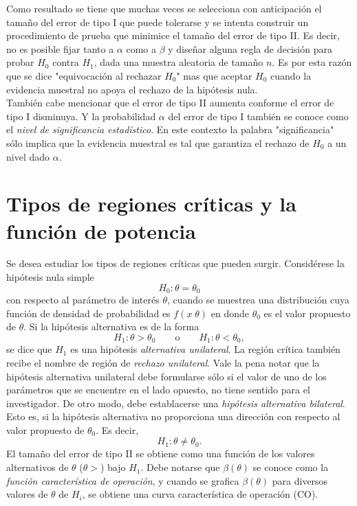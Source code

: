 Como resultado se tiene que muchas veces se selecciona con anticipación el tamaño del error de tipo I que puede tolerarse y se intenta construir un procedimiento de prueba que minimice el tamaño del error de tipo II. Es decir, no es posible fijar tanto a $\alpha$ como a $\beta$ y diseñar alguna regla de decisión para probar $H_0$ contra $H_1$, dada una muestra aleatoria de tamaño $n$. Es por esta razón que se dice "equivocación al rechazar $H_0$" mas que aceptar $H_0$ cuando la evidencia muestral no apoya el rechazo de la hipótesis nula. \\

También cabe mencionar que el error de tipo II aumenta conforme el error de tipo I disminuya. Y la probabilidad $\alpha$ del error de tipo I también se conoce como el \textit{nivel de significancia estadístico}. En este contexto la palabra "significancia" sólo implica que la evidencia muestral es tal que garantiza el rechazo de $H_0$ a un nivel dado $\alpha$.


\section{Tipos de regiones críticas y la función de potencia}

Se desea estudiar los tipos de regiones críticas que pueden surgir. Considérese la hipótesis nula simple
$$H_0:\theta=\theta_0$$
con respecto al parámetro de interés $\theta$, cuando se muestrea una distribución cuya función de densidad de probabilidad es $f(x\; \theta)$ en donde $\theta_0$ es el valor propuesto de $\theta$. Si la hipótesis alternativa es de la forma
$$H_1:\theta>\theta_0\qquad \mbox{o}\qquad H_1:\theta<\theta_0,$$
se dice que $H_1$ es una hipótesis \textit{alternativa unilateral}. La región crítica también recibe el nombre de región de \textit{rechazo unilateral}. Vale la pena notar que la hipótesis alternativa unilateral debe formularse sólo si el valor de uno de los parámetros que se encuentre en el lado opuesto, no tiene sentido para el investigador. De otro modo, debe establacerse una \textit{hipótesis alternativa bilateral}. Esto es, si la hipótesis alternativa no proporciona una dirección con respecto al valor propuesto de $\theta_0$. Es decir,
$$H_1:\theta\neq \theta_0.$$
El tamaño del error de tipo II se obtiene como una función de los valores alternativos de $\theta$ ($\theta>$) bajo $H_1$. Debe notarse que $\beta(\theta)$ se conoce como la \textit{función característica de operación}, y cuando se grafica $\beta(\theta)$ para diversos valores de $\theta$ de $H_i$, se obtiene una curva característica de operación (CO).\\

